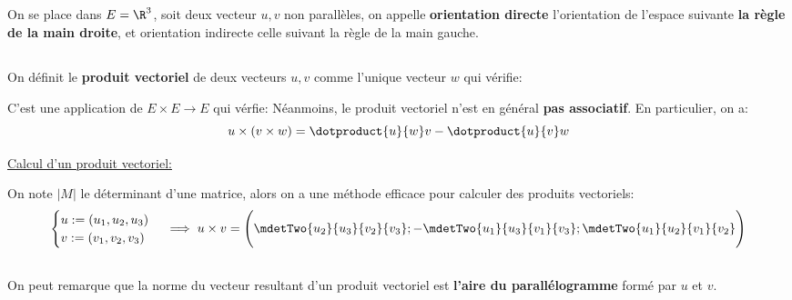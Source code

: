 \subsection*{}
On se place dans \(E = \R^3\), soit deux vecteur \(u, v\) non parallèles, on appelle \textbf{orientation directe} l'orientation de l'espace suivante \textbf{la règle de la main droite}, et orientation indirecte celle suivant la règle de la main gauche.
\pagebreak

\subsection*{}
On définit le \textbf{produit vectoriel} de deux vecteurs \(u, v\) comme l'unique vecteur \(w\) qui vérifie:

C'est une application de \(E \times E \longrightarrow E\) qui vérfie:
Néanmoins, le produit vectoriel n'est en général \textbf{pas associatif}. En particulier, on a:
\[
    u \times (v \times w) = \dotproduct{u}{w}v - \dotproduct{u}{v}w
\]

\underline{Calcul d'un produit vectoriel:}\<

On note \(\big|M\big|\)  le déterminant d'une matrice, alors on a une méthode efficace pour calculer des produits vectoriels:
\[
   \begin{cases}
      u := (u_1, u_2, u_3)\\ 
      v := (v_1, v_2, v_3)
   \end{cases} \implies 
   u \times v = \Biggl(\mdetTwo{u_2}{u_3}{v_2}{v_3} ; -\mdetTwo{u_1}{u_3}{v_1}{v_3} ; \mdetTwo{u_1}{u_2}{v_1}{v_2}\Biggl)
\]
\subsection*{}
On peut remarque que la norme du vecteur resultant d'un produit vectoriel est \textbf{l'aire du parallélogramme} formé par \(u\) et \(v\).\<

